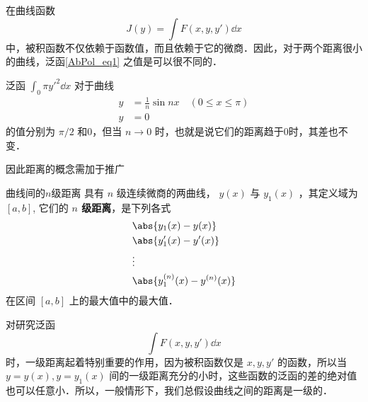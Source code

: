 在曲线函数
\begin{equation}\label{AbPol_eq1}
J(y)=\int F(x,y,y')\dd x
\end{equation}
中，被积函数不仅依赖于函数值，而且依赖于它的微商．因此，对于两个距离很小的曲线，泛函\autoref{AbPol_eq1} 之值是可以很不同的．
\begin{example}{}
泛函 $\int_0\pi y'^2\dd x$ 对于曲线
\begin{equation}
\begin{aligned}
y&=\frac{1}{n}\sin nx\quad (0\leq x\leq \pi)\\
y&=0
\end{aligned}
\end{equation}
的值分别为 $\pi/2$ 和0，但当 $n\rightarrow 0$ 时，也就是说它们的距离趋于0时，其差也不变．
\end{example}

因此距离的概念需加于推广
\begin{definition}{曲线间的$n$级距离}
具有 $n$ 级连续微商的两曲线， $y(x)$ 与 $y_1(x)$ ，其定义域为 $[a,b]$, 它们的 \textbf{$n$ 级距离}，是下列各式
\begin{equation}
\begin{aligned}
&\abs{y_1(x)-y(x)}\\
&\abs{y_1'(x)-y'(x)}\\
&\vdots\\
&\abs{y_1^{(n)}(x)-y^{(n)}(x)}\\
\end{aligned}
\end{equation}
在区间 $[a,b]$ 上的最大值中的最大值．
\end{definition}

对研究泛函
\begin{equation}
\int F(x,y,y')\dd x
\end{equation}
时，一级距离起着特别重要的作用，因为被积函数仅是 $x,y,y'$ 的函数，所以当 $y=y(x),y=y_1(x)$ 间的一级距离充分的小时，这些函数的泛函的差的绝对值也可以任意小．所以，一般情形下，我们总假设曲线之间的距离是一级的．
